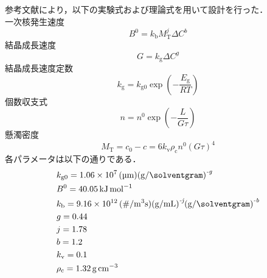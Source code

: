 \documentclass[a4j]{jsreport}
\begin{document}
参考文献\cite{晶析}により，以下の実験式および理論式を用いて設計を行った．\\
一次核発生速度
\begin{equation}
    B^0 = k_\mathrm{b} M_\mathrm{T}^j \Delta C^b
\end{equation}
結晶成長速度
\begin{equation}
    G = k_\mathrm{g}\Delta C^g
\end{equation}
結晶成長速度定数
\begin{equation}
    k_\mathrm{g} = k_\mathrm{g0} \exp \left( -\frac{E_\mathrm{g}}{RT} \right)
\end{equation}
個数収支式
\begin{equation}
    n=n^0 \exp \left( -\frac{L}{G\tau} \right)
\end{equation}
懸濁密度
\begin{equation}
    M_\mathrm{T} = c_0-c = 6k_\mathrm{v} \rho_\mathrm{c} n^0 (G\tau)^4
\end{equation}
各パラメータは以下の通りである．
\begin{align*}
    &k_\mathrm{g0} = 1.06\times10^7 \, \si{(\micro \meter)(\gram / \solventgram)^{\textit{-g}}} \\
    &B^{\mathrm{0}} = 40.05 \, \si{\kilo \joule \per \mole} \\
    &k_\mathrm{b} = 9.16 \times 10^{12} \, \si{(\# / \cubic \meter \second) (\gram / \milli \liter)^{\textit{-j}} (\gram / \solventgram)^{\textit{-b}}} \\
    &g = 0.44 \\
    &j = 1.78 \\
    &b = 1.2 \\
    &k_\mathrm{v} = 0.1 \\
    &\rho_\mathrm{c} = 1.32 \, \si{\gram \per \centi \metre \cubed}
\end{align*}
\end{document}
